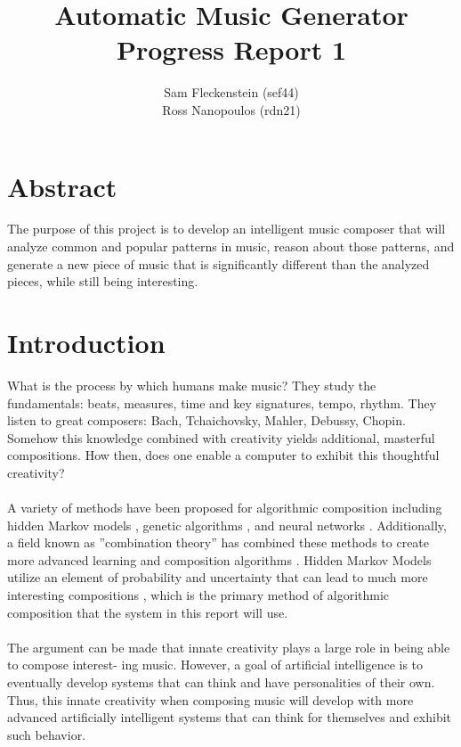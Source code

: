 \documentclass{article}
\begin{document}
\clearpage
{}
\begin{center}
\begin{minipage}{.6\textwidth}

\title{Automatic Music Generator \\ \vspace{2 pt} \Large{Progress Report 1}}
\author{Sam Fleckenstein (sef44) \\ Ross Nanopoulos (rdn21)}
\maketitle

\end{minipage}
\end{center}
\clearpage

\tableofcontents
\newpage

\section{Abstract}
The purpose of this project is to develop an intelligent music composer that will analyze common and popular patterns in music, reason about those patterns, and generate a new piece of music that is significantly different than the analyzed pieces, while still being interesting.

\newpage

\section{Introduction}
What is the process by which humans make music? They study the fundamentals: beats, measures, time
and key signatures, tempo, rhythm. They listen to great composers: Bach, Tchaichovsky, Mahler, Debussy,
Chopin. Somehow this knowledge combined with creativity yields additional, masterful compositions. How
then, does one enable a computer to exhibit this thoughtful creativity?\\
\\
A variety of methods have been proposed for algorithmic composition including hidden Markov models
\cite{SOMETHING GOES HERE}, genetic algorithms \cite{SOMETHING GOES HERE}, and neural networks \cite{SOMETHING GOES HERE}. Additionally, a field known as ”combination theory”
has combined these methods to create more advanced learning and composition algorithms \cite{SOMETHING GOES HERE}. Hidden
Markov Models utilize an element of probability and uncertainty that can lead to much more interesting
compositions \cite{SOMETHING GOES HERE}, which is the primary method of algorithmic composition that the system in this report will
use.\\
\\
The argument can be made that innate creativity plays a large role in being able to compose interest-
ing music. However, a goal of artificial intelligence is to eventually develop systems that can think and
have personalities of their own. Thus, this innate creativity when composing music will develop with more
advanced artificially intelligent systems that can think for themselves and exhibit such behavior.
\end{document}
